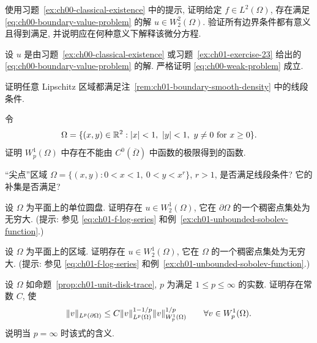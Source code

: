 \begin{MBExercise}
\label{ex:ch01-exercise-23}
使用习题~\ref{ex:ch00-classical-existence} 中的提示, 证明给定 $f\in L^2(\Omega)$, 存在满足
\eqref{eq:ch00-boundary-value-problem} 的解 $u\in W_2^2(\Omega)$. 验证所有边界条件都有意义且得到满足, 并说明应在何种意义下解释该微分方程.
\end{MBExercise}

\begin{MBExercise}
\label{ex:ch01-exercise-24}
设 $u$ 是由习题~\ref{ex:ch00-classical-existence} 或习题~\ref{ex:ch01-exercise-23} 给出的
\eqref{eq:ch00-boundary-value-problem} 的解. 严格证明
\eqref{eq:ch00-weak-problem} 成立.
\end{MBExercise}

\begin{MBExercise}
\label{ex:ch01-exercise-25}
证明任意 Lipschitz 区域都满足注~\ref{rem:ch01-boundary-smooth-density} 中的线段条件.
\end{MBExercise}

\begin{MBExercise}
\label{ex:ch01-exercise-26}
令
\[
\MathBookFormulaID{formula-ch01-exercise-26-slit-domain}
\Omega=\{(x,y)\in\mathbb R^2:|x|<1,\ |y|<1,\ y\neq0
\text{ for }x\geq0\}.
\]
证明 $W_p^1(\Omega)$ 中存在不能由 $C^0(\overline\Omega)$ 中函数的极限得到的函数.
\end{MBExercise}

\begin{MBExercise}
\label{ex:ch01-exercise-27}
``尖点''区域 $\Omega=\{(x,y):0<x<1,\ 0<y<x^r\}$, $r>1$, 是否满足线段条件? 它的补集是否满足?
\end{MBExercise}

\begin{MBExercise}
\label{ex:ch01-exercise-28}
设 $\Omega$ 为平面上的单位圆盘. 证明存在 $u\in W_2^1(\Omega)$, 它在 $\partial\Omega$ 的一个稠密点集处为无穷大. (提示: 参见
\eqref{eq:ch01-f-log-series} 和例~\ref{ex:ch01-unbounded-sobolev-function}.)
\end{MBExercise}

\begin{MBExercise}
\label{ex:ch01-exercise-29}
设 $\Omega$ 为平面上的区域. 证明存在 $u\in W_2^1(\Omega)$, 它在 $\Omega$ 的一个稠密点集处为无穷大. (提示: 参见
\eqref{eq:ch01-f-log-series} 和例~\ref{ex:ch01-unbounded-sobolev-function}.)
\end{MBExercise}

\begin{MBExercise}
\label{ex:ch01-exercise-30}
设 $\Omega$ 如命题~\ref{prop:ch01-unit-disk-trace}, $p$ 为满足 $1\leq p\leq\infty$ 的实数. 证明存在常数 $C$, 使
\[
\MathBookFormulaID{formula-ch01-exercise-30-general-p-trace}
\|v\|_{L^p(\partial\Omega)}
\leq C\|v\|_{L^p(\Omega)}^{1-1/p}
\|v\|_{W_p^1(\Omega)}^{1/p}
\qquad\forall v\in W_p^1(\Omega).
\]
说明当 $p=\infty$ 时该式的含义.
\end{MBExercise}

